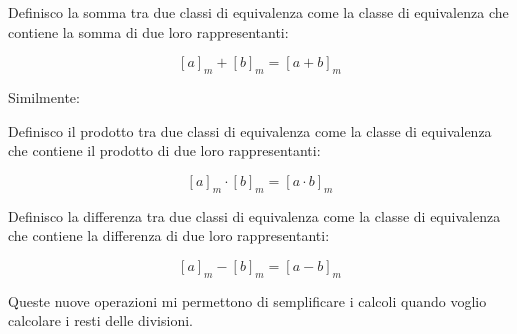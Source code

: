     \begin{definizione}
        Definisco la somma tra due classi di equivalenza come la classe di equivalenza che contiene la somma di due loro rappresentanti:

        \begin{equation}
            \label{eq:somma} [a]_m + [b]_m = [a + b]_m
        \end{equation}
    \end{definizione}

Similmente:

    \begin{definizione}
        Definisco il prodotto tra due classi di equivalenza come la classe di equivalenza che contiene il prodotto di due loro rappresentanti:

        \begin{equation}
            \label{eq:prodotto} [a]_m \cdot [b]_m = [a \cdot b]_m
        \end{equation}
    \end{definizione}

    \begin{definizione}
        Definisco la differenza tra due classi di equivalenza come la classe di equivalenza che contiene la differenza di due loro rappresentanti:

        \begin{equation}
            \label{eq:differenza} [a]_m - [b]_m = [a - b]_m
        \end{equation}
    \end{definizione}

Queste nuove operazioni mi permettono di semplificare i calcoli quando voglio calcolare i resti delle divisioni.

